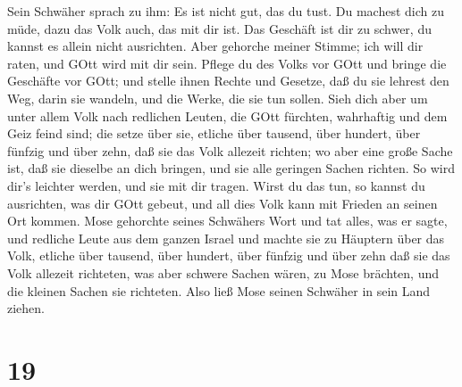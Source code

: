 Sein Schwäher sprach zu ihm: Es ist nicht gut, das du tust.
 Du machest dich zu müde, dazu das Volk auch, das mit dir
ist. Das Geschäft ist dir zu schwer, du kannst es allein nicht
ausrichten.  Aber gehorche meiner Stimme; ich will dir
raten, und GOtt wird mit dir sein. Pflege du des Volks vor GOtt und
bringe die Geschäfte vor GOtt;  und stelle ihnen Rechte und
Gesetze, daß du sie lehrest den Weg, darin sie wandeln, und die Werke,
die sie tun sollen.  Sieh dich aber um unter allem Volk
nach redlichen Leuten, die GOtt fürchten, wahrhaftig und dem Geiz feind
sind; die setze über sie, etliche über tausend, über hundert, über
fünfzig und über zehn,  daß sie das Volk allezeit richten;
wo aber eine große Sache ist, daß sie dieselbe an dich bringen, und sie
alle geringen Sachen richten. So wird dir's leichter werden, und sie mit
dir tragen.  Wirst du das tun, so kannst du ausrichten, was
dir GOtt gebeut, und all dies Volk kann mit Frieden an seinen Ort
kommen.  Mose gehorchte seines Schwähers Wort und tat
alles, was er sagte,  und redliche Leute aus dem ganzen
Israel und machte sie zu Häuptern über das Volk, etliche über tausend,
über hundert, über fünfzig und über zehn  daß sie das Volk
allezeit richteten, was aber schwere Sachen wären, zu Mose brächten, und
die kleinen Sachen sie richteten.  Also ließ Mose seinen
Schwäher in sein Land ziehen.

\hypertarget{section-18}{%
\section{19}\label{section-18}}

